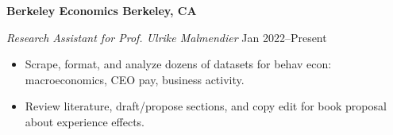 \textbf{Berkeley Economics \hfill Berkeley, CA}\par

\textit{Research Assistant for Prof. Ulrike Malmendier} \hfill Jan 2022--Present \par
\begin{itemize}
	\item Scrape, format, and analyze dozens of datasets for behav econ: macroeconomics, CEO pay, business activity.
	\item Review literature, draft/propose sections, and copy edit for book proposal about experience effects.
\end{itemize}\par